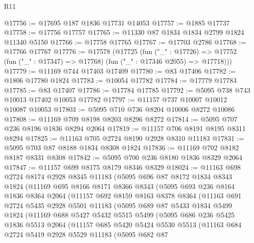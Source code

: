 \begin{lexlean}{R11}
\begin{coremodule}
@17756 := @17695 @187 @1836 @17731 @14053
@17757 := @1885 @17737
@17758 := @17756 @17757
@17765 := @11330 @87 @1834 @1834 @2799 @1824 @11340 @5150
@17766 := @17758 @17765
@17767 := @17703 @2786
@17768 := @17766 @17767
@17776 := @17578
    (@17725
      (fun ("_" : @17726) =>
      @17752 (fun ("_" : @17347) => @17768) (fun ("_" : @17346 @2055) => @17718)))
@17779 := @11169 @744 @17403 @17409
@17780 := @83 @17406
@17782 := @1806 @17780 @1824
@17783 := @10054 @17782
@17784 := @17779 @17783
@17785 := @83 @17407
@17786 := @17784 @17785
@17792 := @5095 @738 @743 @10013 @17402 @10053 @17782
@17797 := @11157 @737 @10007 @10012 @10087 @10053
@17803 := @5095 @710 @736 @8204 @10006 @8272 @10086
@17808 := @11169 @709 @8198 @8203 @8296 @8272
@17814 := @5095 @707 @236 @8196 @1836 @8294 @2064
@17819 := @11157 @706 @8191 @8195 @8311 @8294
@17825 := @11163 @705 @2724 @8190 @2928 @8310 @11183
@17831 := @5095 @703 @87 @8188 @1834 @8308 @1824
@17836 := @11169 @702 @8182 @8187 @8331 @8308
@17842 := @5095 @700 @236 @8180 @1836 @8329 @2064
@17847 := @11157 @699 @8175 @8179 @8346 @8329
@18024 := @11163
    @698
    @2724
    @8174
    @2928
    @8345
    @11183
    (@5095
      @696
      @87
      @8172
      @1834
      @8343
      @1824
      (@11169
        @695
        @8166
        @8171
        @8366
        @8343
        (@5095
          @693
          @236
          @8164
          @1836
          @8364
          @2064
          (@11157
            @692
            @8159
            @8163
            @8378
            @8364
            (@11163
              @691
              @2724
              @5435
              @2928
              @5501
              @11183
              (@5095
                @689
                @87
                @5433
                @1834
                @5499
                @1824
                (@11169
                  @688
                  @5427
                  @5432
                  @5515
                  @5499
                  (@5095
                    @686
                    @236
                    @5425
                    @1836
                    @5513
                    @2064
                    (@11157
                      @685
                      @5420
                      @5424
                      @5530
                      @5513
                      (@11163
                        @684
                        @2724
                        @5419
                        @2928
                        @5529
                        @11183
                        (@5095
                          @682
                          @87

\end{coremodule}
\end{lexlean}
